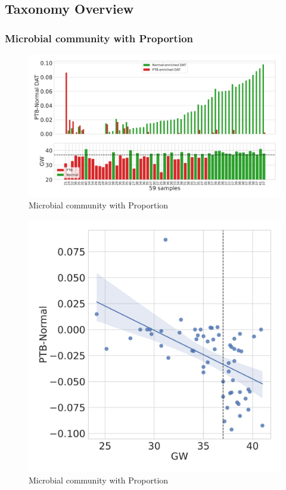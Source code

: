 \documentclass{beamer}
\begin{document}
    \subsection{Taxonomy Overview}
    \begin{frame}[allowframebreaks]
        \frametitle{Microbial community with Proportion}

        \begin{figure}
            \includegraphics[width=0.8 \linewidth]{figures/Step83_Proportion/singleton.DADA2.homd.Mouth.pdf}
            \caption{Microbial community with Proportion}
        \end{figure}

        \begin{figure}
            \includegraphics[width=0.5 \linewidth]{figures/Step84_Propportion/singleton.DADA2.homd.Mouth.pdf}
            \caption{Microbial community with Proportion}
        \end{figure}
    \end{frame}
\end{document}
